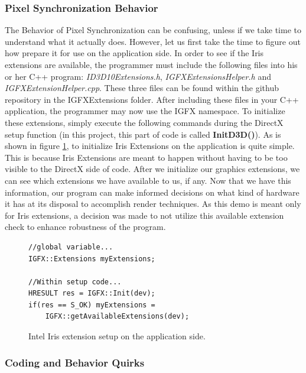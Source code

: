 \documentclass[a4paper, 12pt]{article}
\begin{document}
\subsubsection{Pixel Synchronization Behavior}

The Behavior of Pixel Synchronization can be confusing, unless if we take time
to understand what it actually does. However, let us first take the time to
figure out how prepare it for use on the application side. In order to see if
the Iris extensions are available, the programmer must include the following
files into his or her C++ program: \textit{ID3D10Extensions.h},
\textit{IGFXExtensionsHelper.h} and \textit{IGFXExtensionHelper.cpp}. These
three files can be found within the github repository in the IGFXExtensions
folder. After including these files in your C++ application, the programmer
may now use the IGFX namespace. To initialize these extensions, simply execute
the following commands during the DirectX setup function (in this project,
this part of code is called \textbf{InitD3D()}). As is shown in figure
\ref{code:extInit}, to initialize Iris Extensions on the application is quite
simple. This is because Iris Extensions are meant to happen without having to
be too visible to the DirectX side of code. After we initialize our graphics
extensions, we can see which extensions we have available to us, if any. Now
that we have this information, our program can make informed decisions on what
kind of hardware it has at its disposal to accomplish render techniques. As
this demo is meant only for Iris extensions, a decision was made to not
utilize this available extension check to enhance robustness of the program.

\begin{figure}[h]
\begin{lstlisting}
//global variable...
IGFX::Extensions myExtensions;

//Within setup code...
HRESULT res = IGFX::Init(dev);
if(res == S_OK) myExtensions = 
	IGFX::getAvailableExtensions(dev);

\end{lstlisting}
\caption{Intel Iris extension setup on the application side.}
\label{code:extInit}
\end{figure}

\subsubsection{Coding and Behavior Quirks}

\lipsum[75-99]
\end{document}
